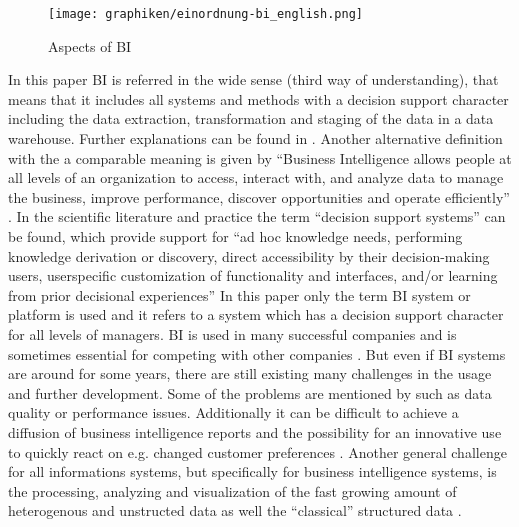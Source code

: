 \begin{figure}[H]
\centering
\texttt{[image: graphiken/einordnung-bi\_english.png]}%
\caption{Aspects of BI \citep[p.7]{gluchowski2001}}%
\label{aspects_bi}%
\end{figure}

In this paper BI is referred in the wide sense (third way of understanding), that means that it includes all systems and methods with a decision support character including the data extraction, transformation and staging of the data in a data warehouse. Further explanations can be found in \citet{gluchowski2001}. Another alternative definition with the a comparable meaning is given by \citet{howson_bi_2007} ``Business Intelligence allows people at all levels of an organization to access, interact with, and analyze data to manage the business, improve performance, discover opportunities and operate efficiently'' \citep{howson_bi_2007}. In the scientific literature and practice the term ``decision support systems'' can be found, which provide support for ``ad hoc knowledge needs, performing knowledge derivation or discovery, direct accessibility by their decision-making users, userspecific
customization of functionality and interfaces, and/or learning from prior
decisional experiences'' \citep[p.IX]{burstein_handbook_2008} In this paper only the term BI system or platform is used and it refers to a system which has a decision support character for all levels of managers. 
\newline\newline
BI is used in many successful companies and is sometimes essential for competing with other companies \citep{chaudhuri_overview_2011}. But even if BI systems are around for some years, there are still existing many challenges in the usage and further development. Some of the problems are mentioned by \citet{ganosr_von_2010} such as data quality or performance issues. Additionally it can be difficult to achieve a diffusion of business intelligence reports and the possibility for an innovative use to quickly react on e.g. changed customer preferences \citep{kretzer_designer_2015}.
\newline\newline
Another general challenge for all informations systems, but specifically for business intelligence systems, is the processing, analyzing and visualization of the fast growing amount of heterogenous and unstructed data as well the ``classical'' structured data \citep{chaudhuri_overview_2011, economist_data_2010, dhar_data_2013}.

